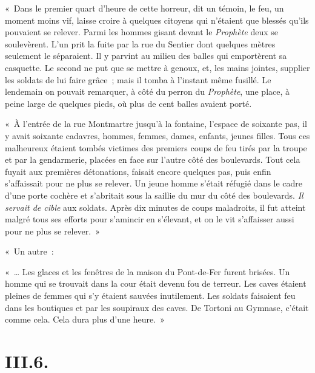 \documentclass[french,twoside]{book} %
\newenvironment{quoteblock}%
  {\begin{quoting}}
  {\end{quoting}}
\newenvironment{quotebar}{%
    \def\FrameCommand{{\color{rubric!10!}\vrule width 0.5em} \hspace{0.9em}}%
    \def\OuterFrameSep{0pt} %
    \MakeFramed {\advance\hsize-\width \FrameRestore}
  }%
  {%
    \endMakeFramed
  }
\renewenvironment{quoteblock}%
  {%
    \savenotes
    \setstretch{0.9}
    \begin{quotebar}
    \smallskip
  }
  {%
    \smallskip
    \end{quotebar}
    \spewnotes
  }
\begin{document}
\begin{quoteblock}
 \noindent « Dans le premier quart d’heure de cette horreur, dit un témoin, le feu, un moment moins vif, laisse croire à quelques citoyens qui n’étaient que blessés qu’ils pouvaient se relever. Parmi les hommes gisant devant le \emph{Prophète} deux se soulevèrent. L’un prit la fuite par la rue du Sentier dont quelques mètres seulement le séparaient. Il y parvint au milieu des balles qui emportèrent sa casquette. Le second ne put que se mettre à genoux, et, les mains jointes, supplier les soldats de lui faire grâce ; mais il tomba à l’instant même fusillé. Le lendemain on pouvait remarquer, à côté du perron du \emph{Prophète}, une place, à peine large de quelques pieds, où plus de cent balles avaient porté.\par
 « À l’entrée de la rue Montmartre jusqu’à la fontaine, l’espace de soixante pas, il y avait soixante cadavres, hommes, femmes, dames, enfants, jeunes filles. Tous ces malheureux étaient tombés victimes des premiers coups de feu tirés par la troupe et par la gendarmerie, placées en face sur l’autre côté des boulevards. Tout cela fuyait aux premières détonations, faisait encore quelques pas, puis enfin s’affaissait pour ne plus se relever. Un jeune homme s’était réfugié dans le cadre d’une porte cochère et s’abritait sous la saillie du mur du côté des boulevards. \emph{Il servait de cible} aux soldats. Après dix minutes de coups maladroits, il fut atteint malgré tous ses efforts pour s’amincir en s’élevant, et on le vit s’affaisser aussi pour ne plus se relever. »
 \end{quoteblock}

« Un autre :\par

\begin{quoteblock}
 \noindent « … Les glaces et les fenêtres de la maison du Pont-de-Fer furent brisées. Un homme qui se trouvait dans la cour était devenu fou de terreur. Les caves étaient pleines de femmes qui s’y étaient sauvées inutilement. Les soldats faisaient feu dans les boutiques et par les soupiraux des caves. De Tortoni au Gymnase, c’était comme cela. Cela dura plus d’une heure. »
 \end{quoteblock}


\section[{III.6.}]{III.6.}
\end{document}
